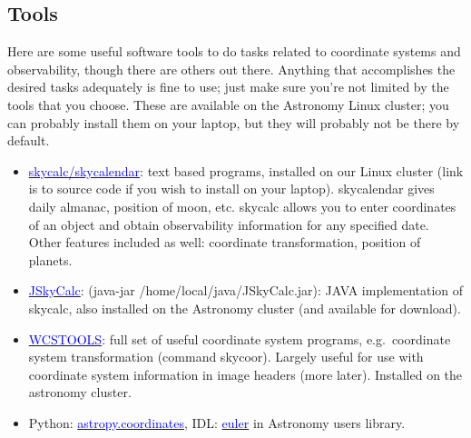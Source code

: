 \documentclass[12pt]{article}
\begin{document}
\subsection*{Tools}
Here are some useful software tools to do tasks related to coordinate systems
and observability, though there are others out there. Anything that
accomplishes the desired tasks adequately is fine to use; just make sure
you're not limited by the tools that you choose. These are available
on the Astronomy Linux cluster; you can probably install them on your
laptop, but they will probably not be there by default.
\begin{itemize}
    \item \href{http://physics.dartmouth.edu/}
        {\textcolor{blue}{skycalc/skycalendar}}:
        text based programs, installed on our Linux cluster (link is
        to source code if you wish to install on your laptop).
        skycalendar gives daily almanac, position of moon, etc.
        skycalc allows you to enter coordinates of an object and
        obtain observability information for any specified date. Other
        features included as well: coordinate transformation, position
        of planets.
    \item \href{http://physics.dartmouth.edu/}
        {\textcolor{blue}{JSkyCalc}}:
        (java-jar /home/local/java/JSkyCalc.jar): JAVA implementation
        of skycalc, also installed on the Astronomy cluster (and
        available for download).
    \item \href{http://tdc-www.harvard.edu/wcstools/}
        {\textcolor{blue}{WCSTOOLS}}: full set of useful coordinate
        system programs, e.g.\ coordinate system transformation
        (command skycoor). Largely useful for use with coordinate
        system information in image
        headers (more later). Installed on the astronomy cluster.
    \item Python: \href{http://docs.astropy.org/en/stable/coordinates/}
        {\textcolor{blue}{astropy.coordinates}},
        IDL:
        \href{http://idlastro.gsfc.nasa.gov/ftp/pro/astro/euler.pro}
        {\textcolor{blue}{euler}} in Astronomy users library.
\end{itemize}
\end{document}
